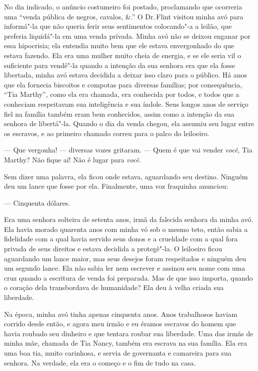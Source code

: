 No dia indicado, o anúncio costumeiro
foi postado, proclamando que ocorreria uma ``venda pública de negros,
cavalos, \&.'' O Dr.\,Flint visitou minha avó para informá"-la que não
queria ferir seus sentimentos colocando"-a a leilão, que preferia
liquidá"-la em uma venda privada. Minha avó não se deixou enganar por
essa hipocrisia; ela entendia muito bem que ele estava envergonhado do
que estava fazendo. Ela era uma mulher muito cheia de energia, e se ele
seria vil o suficiente para vendê"-la quando a intenção da sua senhora
era que ela fosse libertada, minha avó estava decidida a deixar isso
claro para o público. Há anos que ela fornecia biscoitos e compotas para
diversas famílias; por consequência, ``Tia Marthy'', como ela era
chamada, era conhecida por todos, e todos que a conheciam respeitavam
sua inteligência e sua índole. Seus longos anos de serviço fiel na
família também eram bem conhecidos, assim como a intenção da sua senhora
de libertá"-la. Quando o dia da venda chegou, ela assumiu seu lugar entre
os escravos, e ao primeiro chamado correu para o palco do leiloeiro.

--- Que vergonha! --- diversas vozes gritaram. --- Quem é que vai vender
\emph{você}, Tia Marthy? Não fique aí! Não é lugar para \emph{você}.

Sem dizer uma palavra, ela ficou onde estava, aguardando seu destino.
Ninguém deu um lance que fosse por ela. Finalmente, uma voz fraquinha
anunciou:

--- Cinquenta dólares.

Era uma senhora solteira de setenta anos, irmã da falecida senhora da
minha avó. Ela havia morado quarenta anos com minha vó sob o mesmo teto,
então sabia a fidelidade com a qual havia servido seus donos e a
crueldade com a qual fora privada de seus direitos e estava decidida a
protegê"-la. O leiloeiro ficou aguardando um lance maior, mas seus
desejos foram respeitados e ninguém deu um segundo lance. Ela não sabia
ler nem escrever e assinou seu nome com uma cruz quando a escritura de
venda foi preparada. Mas de que isso importa, quando o coração dela
transbordava de humanidade? Ela deu à velha criada sua liberdade.

Na época, minha avó tinha apenas
cinquenta anos. Anos trabalhosos haviam corrido desde então, e agora meu
irmão e eu éramos escravos do homem que havia roubado seu dinheiro e que
tentara roubar sua liberdade. Uma das irmãs de minha mãe, chamada de Tia
Nancy, também era escrava na sua família. Ela era uma boa tia, muito
carinhosa, e servia de governanta e camareira para sua senhora. Na
verdade, ela era o começo e o fim de tudo na casa.

